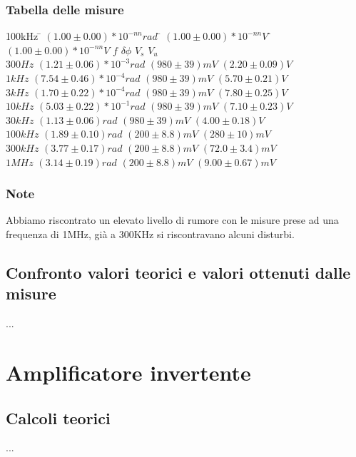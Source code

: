 \documentclass{article}
\begin{document}
\subsubsection{Tabella delle misure}
\large \begin{tabbing}
100kHz \= $(1.00 \pm 0.00) * 10^{-nn} rad$ \= $(1.00 \pm 0.00) * 10^{-nn} V$ \= $(1.00 \pm 0.00) * 10^{-nn} V$ \kill
 $f$ \> $\delta\phi$ \> $V_s$ \> $V_{u}$ \\
$300Hz$ \> $(1.21 \pm 0.06)*10^{-3} rad$ \> $(980 \pm 39) mV$ \> $(2.20 \pm 0.09) V$ \\
$1kHz$ \> $(7.54 \pm 0.46)*10^{-4} rad$ \> $(980 \pm 39) mV$ \> $(5.70 \pm 0.21) V$ \\
$3kHz$ \> $(1.70 \pm 0.22)*10^{-4} rad$ \> $(980 \pm 39) mV$ \> $(7.80 \pm 0.25) V$ \\
$10kHz$ \> $(5.03 \pm 0.22)*10^{-1} rad$ \> $(980 \pm 39) mV$ \> $(7.10 \pm 0.23) V$ \\
$30kHz$ \> $(1.13 \pm 0.06) rad$ \> $(980 \pm 39) mV$ \> $(4.00 \pm 0.18) V$ \\
$100kHz$ \> $(1.89 \pm 0.10) rad$ \> $(200 \pm 8.8) mV$ \> $(280 \pm 10) mV$ \\
$300kHz$ \> $(3.77 \pm 0.17) rad$ \> $(200 \pm 8.8) mV$ \> $(72.0 \pm 3.4) mV$ \\
$1MHz$ \> $(3.14 \pm 0.19) rad$ \> $(200 \pm 8.8) mV$ \> $(9.00 \pm 0.67) mV$ \\
\end{tabbing}
\subsubsection{Note}
Abbiamo riscontrato un elevato livello di rumore con le misure prese ad una frequenza di 1MHz, già a 300KHz si riscontravano alcuni disturbi.
\subsection{Confronto valori teorici e valori ottenuti dalle misure}
...

\section{Amplificatore invertente}
\subsection{Calcoli teorici}
...
\end{document}
